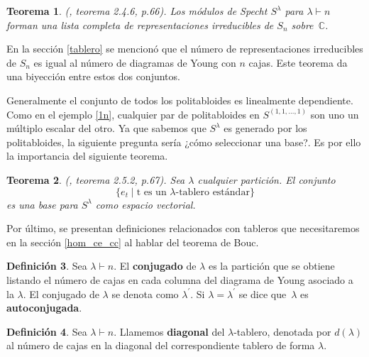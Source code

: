 \documentclass[12pt]{book}
\newtheorem{theorem}{Teorema}[section]
\newtheorem{corollary}[theorem]{Corolario}
\theoremstyle{definition}
\newtheorem{definition}[theorem]{Definición}
\newcounter{in}
\newcounter{ini}
\begin{document}
\begin{theorem}{\normalfont(\cite{sagan2001symmetric}, teorema 2.4.6, p.66)}.
  Los módulos de Specht $S^{\lambda}$ para $\lambda\vdash n$ forman
  una lista completa de representaciones irreducibles de $S_{n}$ sobre~$\mathbb{C}$.
  \label{todas-repr-irre}
\end{theorem}
En la sección \ref{tablero} se mencionó que el número de
representaciones irreducibles de $S_{n}$ es igual al número de
diagramas de Young con $n$ cajas. Este teorema da una biyección entre
estos dos conjuntos.

Generalmente el conjunto de todos los politabloides es linealmente
dependiente. Como en el ejemplo \ref{1n}, cualquier par de
politabloides en $S^{(1,1,\ldots,1)}$ son uno un múltiplo escalar del
otro. Ya que sabemos que $S^{\lambda}$ es generado por los
politabloides, la siguiente pregunta sería ¿cómo seleccionar una
base?. Es por ello la importancia del siguiente teorema.

\begin{theorem}{\normalfont(\cite{sagan2001symmetric}, teorema 2.5.2, p.67)}.
  \label{base-S}
  Sea $\lambda$ cualquier partición. El conjunto
  \begin{equation*}
    \{e_{t}\mid \mbox{t es un $\lambda$-tablero estándar}\}
  \end{equation*}
  es una base para $S^{\lambda}$ como espacio vectorial.
\end{theorem}
Por último, se presentan definiciones relacionados con tableros que
necesitaremos en la sección \ref{hom_ce_cc} al hablar del teorema de Bouc.

\begin{definition}
  Sea $\lambda\vdash n$. El \textbf{conjugado} de $\lambda$ es la
  partición que se obtiene listando el número de cajas en cada columna
  del diagrama de Young asociado a la $\lambda$. El conjugado de
  $\lambda$ se denota como $\lambda^{'}$. Si $\lambda=\lambda^{'}$ se
  dice que~$\lambda$ es \textbf{autoconjugada}.
\end{definition}

\begin{definition}
  Sea $\lambda\vdash n$. Llamemos \textbf{diagonal} del
  $\lambda$-tablero, denotada por $d(\lambda)$ al número de
  cajas en la diagonal del correspondiente tablero de forma $\lambda$.
\end{definition}
\end{document}
